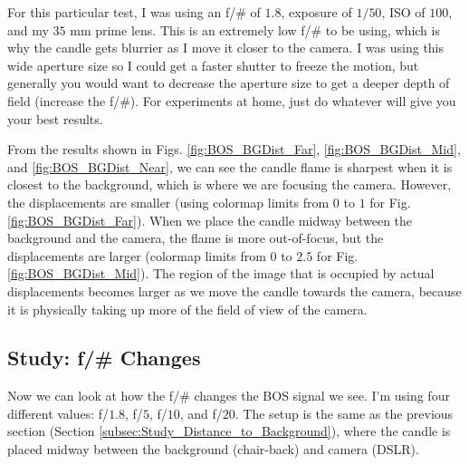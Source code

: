 \documentclass[letterpaper,12pt]{article}
\begin{document}
For this particular test, I was using an f/\# of $1.8$, exposure of $1/50$, ISO of $100$, and my $35$ mm prime lens.  This is an extremely low f/\# to be using, which is why the candle gets blurrier as I move it closer to the camera.  I was using this wide aperture size so I could get a faster shutter to freeze the motion, but generally you would want to decrease the aperture size to get a deeper depth of field (increase the f/\#).  For experiments at home, just do whatever will give you your best results.

From the results shown in Figs. \ref{fig:BOS_BGDist_Far}, \ref{fig:BOS_BGDist_Mid}, and \ref{fig:BOS_BGDist_Near}, we can see the candle flame is sharpest when it is closest to the background, which is where we are focusing the camera.  However, the displacements are smaller (using colormap limits from $0$ to $1$ for Fig. \ref{fig:BOS_BGDist_Far}).  When we place the candle midway between the background and the camera, the flame is more out-of-focus, but the displacements are larger (colormap limits from $0$ to $2.5$ for Fig. \ref{fig:BOS_BGDist_Mid}).  The region of the image that is occupied by actual displacements becomes larger as we move the candle towards the camera, because it is physically taking up more of the field of view of the camera.

\subsection{Study: f/\# Changes}
\label{subsec:Study_F_Number_Changes}

Now we can look at how the f/\# changes the BOS signal we see.  I'm using four different values: f/$1.8$, f/$5$, f/$10$, and f/$20$.  The setup is the same as the previous section (Section \ref{subsec:Study_Distance_to_Background}), where the candle is placed midway between the background (chair-back) and camera (DSLR).
\end{document}
